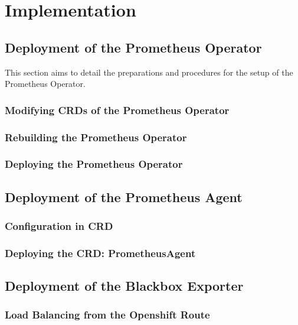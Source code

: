 
\chapter{Implementation}\label{chapter:implementation}

\section{Deployment of the Prometheus Operator}

This section aims to detail the preparations and procedures for the setup of the Prometheus Operator. 

\subsection{Modifying CRDs of the Prometheus Operator}

\subsection{Rebuilding the Prometheus Operator}

\subsection{Deploying the Prometheus Operator}

\section{Deployment of the Prometheus Agent}

\subsection{Configuration in CRD}

\subsection{Deploying the CRD: PrometheusAgent}

\section{Deployment of the Blackbox Exporter}

\subsection{Load Balancing from the Openshift Route}

